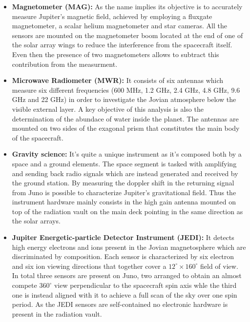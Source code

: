 \begin{itemize}
    \item \textbf{Magnetometer (MAG):} As the name implies its objective is to 
    accurately measure Jupiter's magnetic field, achieved by employing a fluxgate 
    magnetometer, a scalar helium magnetometer and star cameras. All the sensors 
    are mounted on the magnetometer boom located at the end of one of the solar 
    array wings to reduce the interference from the spacecraft itself. Even then the 
    presence of two magnetometers allows to subtract this contribution from the 
    measurment.
    
    \item \textbf{Microwave Radiometer (MWR):} It consists of six antennas which 
    measure six different frequencies (600 MHz, 1.2 GHz, 2.4 GHz, 4.8 GHz, 9.6 GHz 
    and 22 GHz) in order to investigate the Jovian atmosphere below the visible 
    external layer. A key objective of this analysis is also the determination of 
    the abundace of water inside the planet. The antennas are mounted on two sides 
    of the exagonal prism that constitutes the main body of the spacecraft.
    
    \item \textbf{Gravity science:} It's quite a unique instrument as it's composed
    both by a space and a ground elements. The space segment is tasked with 
    amplifying and sending back radio signals which are instead generated and 
    received by the ground station. By measuring the doppler shift in the returning
    signal from Juno is possible to characterize Jupiter's gravitational field. Thus
    the instrument hardware mainly consists in the high gain antenna mounted on top 
    of the radiation vault on the main deck pointing in the same direction as the 
    solar arrays.
    
    \item \textbf{Jupiter Energetic-particle Detector Instrument (JEDI):} It detects
    high energy electrons and ions present in the Jovian magnetosphere which are
    discriminated by composition. Each sensor is characterized by six electron and 
    six ion viewing directions that together cover a \(12^{\circ} \times 
    160^{\circ}\) field of view. In total three sensors are present on Juno, two
    arranged to obtain an almost compete \(360^{\circ}\) view perpendicular to 
    the spacecraft spin axis whle the third one is instead aligned with it to 
    achieve a full scan of the sky over one spin period. As the JEDI sensors are
    self-contained no electronic hardware is present in the radiation vault.
       
\end{itemize}